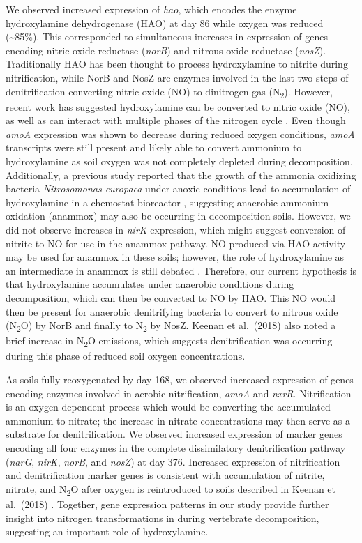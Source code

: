 \documentclass[
  sn-nature,
  lineno, referee]{sn-jnl}
\begin{document}
We observed increased expression of \emph{hao}, which encodes the enzyme
hydroxylamine dehydrogenase (HAO) at day 86 while oxygen was reduced
(\textasciitilde85\%). This corresponded to simultaneous increases in
expression of genes encoding nitric oxide reductase (\emph{norB}) and
nitrous oxide reductase (\emph{nosZ}). Traditionally HAO has been
thought to process hydroxylamine to nitrite during nitrification, while
NorB and NosZ are enzymes involved in the last two steps of
denitrification converting nitric oxide (NO) to dinitrogen gas
(N\textsubscript{2}). However, recent work has suggested hydroxylamine
can be converted to nitric oxide (NO), as well as can interact with
multiple phases of the nitrogen cycle
\citep{soler-jofra_hydroxylamine_2021}. Even though \emph{amoA}
expression was shown to decrease during reduced oxygen conditions,
\emph{amoA} transcripts were still present and likely able to convert
ammonium to hydroxylamine as soil oxygen was not completely depleted
during decomposition. Additionally, a previous study reported that the
growth of the ammonia oxidizing bacteria \emph{Nitrosomonas europaea}
under anoxic conditions lead to accumulation of hydroxylamine in a
chemostat bioreactor \citep{yu_nitrosomonas_2018}, suggesting anaerobic
ammonium oxidation (anammox) may also be occurring in decomposition
soils. However, we did not observe increases in \emph{nirK} expression,
which might suggest conversion of nitrite to NO for use in the anammox
pathway. NO produced via HAO activity may be used for anammox in these
soils; however, the role of hydroxylamine as an intermediate in anammox
is still debated \citep{soler-jofra_hydroxylamine_2021}. Therefore, our
current hypothesis is that hydroxylamine accumulates under anaerobic
conditions during decomposition, which can then be converted to NO by
HAO. This NO would then be present for anaerobic denitrifying bacteria
to convert to nitrous oxide (N\textsubscript{2}O) by NorB and finally to
N\textsubscript{2} by NosZ. Keenan et al.~(2018)
\citep{keenan_mortality_2018} also noted a brief increase in
N\textsubscript{2}O emissions, which suggests denitrification was
occurring during this phase of reduced soil oxygen concentrations.

As soils fully reoxygenated by day 168, we observed increased expression
of genes encoding enzymes involved in aerobic nitrification, \emph{amoA}
and \emph{nxrR}. Nitrification is an oxygen-dependent process which
would be converting the accumulated ammonium to nitrate; the increase in
nitrate concentrations may then serve as a substrate for
denitrification. We observed increased expression of marker genes
encoding all four enzymes in the complete dissimilatory denitrification
pathway (\emph{narG}, \emph{nirK}, \emph{norB}, and \emph{nosZ}) at day
376. Increased expression of nitrification and denitrification marker
genes is consistent with accumulation of nitrite, nitrate, and
N\textsubscript{2}O after oxygen is reintroduced to soils described in
Keenan et al.~(2018)
\citep{keenan_mortality_2018, debruyn_carrion_2024}. Together, gene
expression patterns in our study provide further insight into nitrogen
transformations in during vertebrate decomposition, suggesting an
important role of hydroxylamine.
\end{document}
